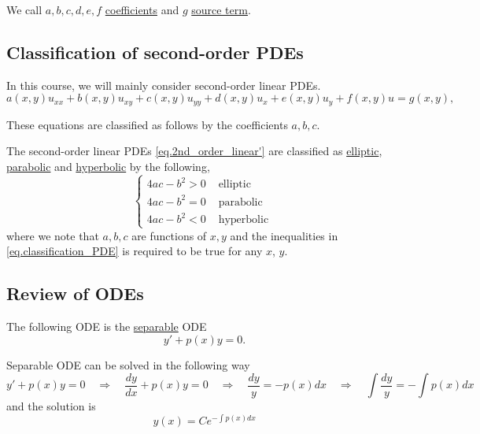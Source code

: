 \begin{definition}[]
    We call $a, b, c, d, e, f$ \underline{coefficients} and $g$ \underline{source term}. 
\end{definition}

\subsection{Classification of second-order PDEs}

In this course, we will mainly consider second-order linear PDEs.
\begin{equation}\label{eq.2nd_order_linear'}
    a(x, y) u_{x x}+b(x, y) u_{x y}+c(x, y) u_{y y}+d(x, y) u_x+e(x, y) u_y+f(x, y) u=g(x, y),
\end{equation}

These equations are classified as follows by the coefficients $a, b, c$.

\begin{definition} The second-order linear PDEs \eqref{eq.2nd_order_linear'} are classified as \underline{elliptic}, \underline{parabolic} and \underline{hyperbolic} by the following,
    \begin{equation}\label{eq.classification_PDE}
        \begin{cases}
            4 a c-b^2>0 & \text { elliptic } 
            \\ 
            4 a c-b^2=0 & \text { parabolic } 
            \\ 
            4 a c-b^2<0 & \text { hyperbolic }
        \end{cases}
    \end{equation}
where we note that $a, b, c$ are functions of $x, y$ and the inequalities in \eqref{eq.classification_PDE} is required to be true for any $x$, $y$.
\end{definition}


\subsection{Review of ODEs}

\begin{definition}
    The following ODE is the \underline{separable} ODE
    \begin{equation}\label{eq.separable}
        y' + p(x)y = 0.
    \end{equation}
\end{definition}

\begin{theorem}[]\label{th.separable_ODE}
    Separable ODE can be solved in the following way
    \begin{equation*}
        y' + p(x)y = 0
        \quad\Rightarrow\quad \frac{dy}{dx} + p(x)y = 0 \quad\Rightarrow\quad \frac{dy}{y} = - p(x)dx
        \quad\Rightarrow\quad
        \int \frac{dy}{y} = - \int p(x)dx
    \end{equation*}
    and the solution is 
    \begin{equation}\label{eq.sol_separable}
        y(x) = Ce^{-\int p(x)dx}
    \end{equation}
\end{theorem}

